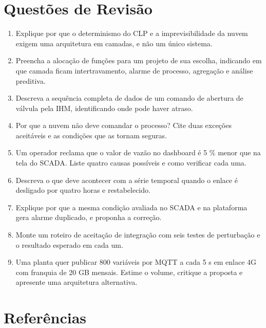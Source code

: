 \section{Questões de Revisão}\label{questuxf5es-de-revisuxe3o}

\begin{enumerate}
\def\labelenumi{\arabic{enumi}.}
\tightlist
\item
  Explique por que o determinismo do CLP e a imprevisibilidade da nuvem exigem uma arquitetura em camadas, e não um único sistema.
\item
  Preencha a alocação de funções para um projeto de sua escolha, indicando em que camada ficam intertravamento, alarme de processo, agregação e análise preditiva.
\item
  Descreva a sequência completa de dados de um comando de abertura de válvula pela IHM, identificando onde pode haver atraso.
\item
  Por que a nuvem não deve comandar o processo? Cite duas exceções aceitáveis e as condições que as tornam seguras.
\item
  Um operador reclama que o valor de vazão no dashboard é 5 \% menor que na tela do SCADA. Liste quatro causas possíveis e como verificar cada uma.
\item
  Descreva o que deve acontecer com a série temporal quando o enlace é desligado por quatro horas e restabelecido.
\item
  Explique por que a mesma condição avaliada no SCADA e na plataforma gera alarme duplicado, e proponha a correção.
\item
  Monte um roteiro de aceitação de integração com seis testes de perturbação e o resultado esperado em cada um.
\item
  Uma planta quer publicar 800 variáveis por MQTT a cada 5 s em enlace 4G com franquia de 20 GB mensais. Estime o volume, critique a proposta e apresente uma arquitetura alternativa.
\end{enumerate}

\section{Referências}\label{referuxeancias}

